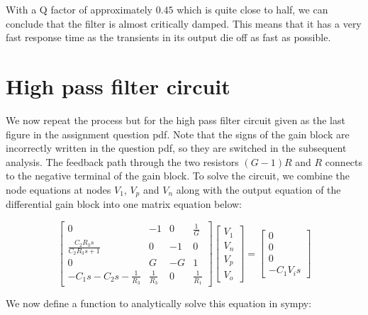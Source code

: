 \documentclass[11pt]{article}
\begin{document}
	
		
    With a Q factor of approximately \(0.45\) which is quite close to half,
we can conclude that the filter is almost critically damped. This means
that it has a very fast response time as the transients in its output
die off as fast as possible.

	

	
		
    \section{High pass filter circuit}\label{high-pass-filter-circuit}

We now repeat the process but for the high pass filter circuit given as
the last figure in the assignment question pdf. Note that the signs of
the gain block are incorrectly written in the question pdf, so they are
switched in the subsequent analysis. The feedback path through the two
resistors \((G-1)R\) and \(R\) connects to the negative terminal of the
gain block. To solve the circuit, we combine the node equations at nodes
\(V_1\), \(V_p\) and \(V_n\) along with the output equation of the
differential gain block into one matrix equation below:

	

	

    $$\left[\begin{matrix}0 & -1 & 0 & \frac{1}{G}\\\frac{C_{2} R_{3} s}{C_{2} R_{3} s + 1} & 0 & -1 & 0\\0 & G & - G & 1\\- C_{1} s - C_{2} s - \frac{1}{R_{3}} & \frac{1}{R_{3}} & 0 & \frac{1}{R_{1}}\end{matrix}\right] \left[\begin{matrix}V_{1}\\V_{n}\\V_{p}\\V_{o}\end{matrix}\right] = \left[\begin{matrix}0\\0\\0\\- C_{1} V_{i} s\end{matrix}\right]$$

    
	
		
    We now define a function to analytically solve this equation in sympy:

	

	
		
\end{document}
